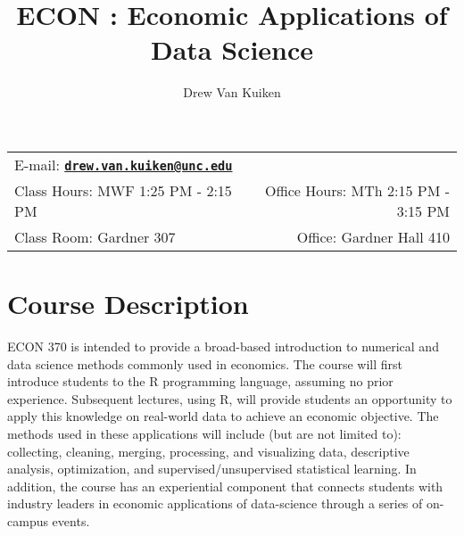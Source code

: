 \documentclass[11pt]{article}
\title{ECON \CourseNum: Economic Applications of Data Science} %
\author{Drew Van Kuiken}                                            %
\date{\SemSeason \SemYear}                                     %
\newcommand{\CourseNum}{370\xspace}         %
\begin{document}
\maketitle

\begin{tabular*}{\textwidth}{@{\extracolsep{\fill}}lr}

E-mail: \href{mailto:drew.van.kuiken@unc.edu}{\tt\bf drew.van.kuiken@unc.edu} \\ %

Class Hours: MWF 1:25 PM - 2:15 PM & Office Hours: MTh 2:15 PM - 3:15 PM \\

Class Room: Gardner 307 & Office: Gardner Hall 410 \\
\hline
\end{tabular*}
\vspace{2 mm}

\section*{Course Description}
ECON \CourseNum is intended to provide a broad-based introduction to numerical and data science methods commonly used in economics. The course will first introduce students to the R programming language, assuming no prior experience. Subsequent lectures, using R, will provide students an opportunity to apply this knowledge on real-world data to achieve an economic objective.  The methods used in these applications will include (but are not limited to): collecting, cleaning, merging, processing, and visualizing data, descriptive analysis, optimization, and supervised/unsupervised statistical learning. In addition, the course has an experiential component that connects students with industry leaders in economic applications of data-science through a series of on-campus events.
\end{document}
